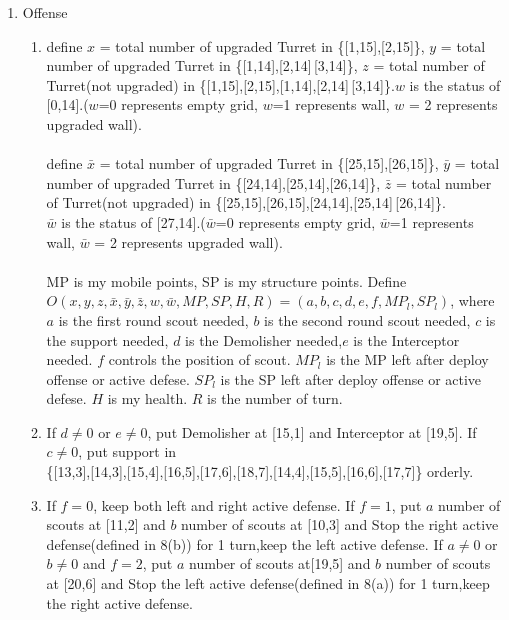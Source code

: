 \documentclass[12pt]{article}
\begin{document}
\begin{enumerate}
\item Offense
\begin{enumerate}
\item define $x$ = total number of upgraded Turret in \{[1,15],[2,15]\}, $y$ = total number of upgraded Turret in \{[1,14],[2,14]\,[3,14]\}, $z$ = total number of Turret(not upgraded) in  \{[1,15],[2,15],[1,14],[2,14]\,[3,14]\}.$w$ is the status of [0,14].($w$=0 represents empty grid, $w$=1 represents wall, $w$ = 2 represents upgraded wall).\\\\define $\bar{x}$ = total number of upgraded Turret in \{[25,15],[26,15]\}, $\bar{y}$ = total number of upgraded Turret in \{[24,14],[25,14],[26,14]\}, $\bar{z}$ = total number of Turret(not upgraded) in  \{[25,15],[26,15],[24,14],[25,14]\,[26,14]\}.\\$\bar{w}$ is the status of [27,14].($\bar{w}$=0 represents empty grid, $\bar{w}$=1 represents wall, $\bar{w}$ = 2 represents upgraded wall).\\ \\MP is my mobile points, SP is my structure points. Define\\ $O(x,y,z,\bar{x},\bar{y},\bar{z},w,\bar{w},MP,SP,H,R) = (a,b,c,d,e,f,MP_l,SP_l)$, where $a$ is the first round scout needed, $b$ is the second round scout needed, $c$ is the support needed, $d$ is the Demolisher needed,$e$ is the Interceptor needed. $f$ controls the position of scout. $MP_l$ is the MP left after deploy offense or active defese. $SP_l$ is the SP left after deploy offense or active defese. $H$ is my health. $R$ is the number of turn.
\item If $d \neq 0$ or $e \neq 0$, put Demolisher at  [15,1] and Interceptor at [19,5]. If $c \neq 0$, put support in\\ \{[13,3],[14,3],[15,4],[16,5],[17,6],[18,7],[14,4],[15,5],[16,6],[17,7]\} orderly.
\item If $f =0$, keep both left and right active defense. If $f =1$, put $a$ number of scouts at [11,2] and $b$ number of scouts at [10,3] and Stop the right active defense(defined in 8(b)) for 1 turn,keep the left active defense. If $a \neq 0$ or $b \neq 0$ and $f =2$, put $a$ number of scouts at[19,5] and $b$ number of scouts at [20,6] and Stop the left active defense(defined in 8(a)) for 1 turn,keep the right active defense.
\end{enumerate}
\end{enumerate}
\end{document}
